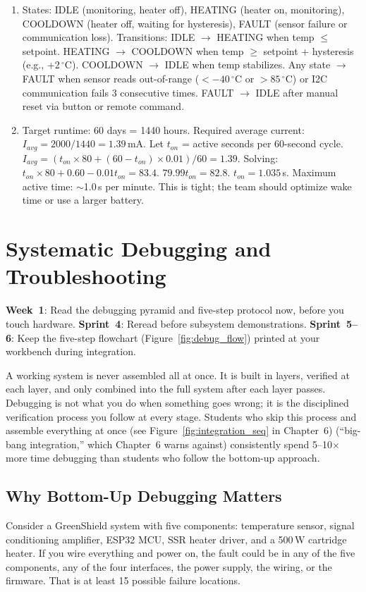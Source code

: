 \documentclass[11pt,letterpaper,twoside,openany]{book}
\newcommand{\degC}{\ensuremath{{}^{\circ}\text{C}}}
\begin{document}
\begin{enumerate}[leftmargin=1.5em]
\item States: IDLE (monitoring, heater off), HEATING (heater on, monitoring), COOLDOWN (heater off, waiting for hysteresis), FAULT (sensor failure or communication loss). Transitions: IDLE $\to$ HEATING when temp $\leq$ setpoint. HEATING $\to$ COOLDOWN when temp $\geq$ setpoint + hysteresis (e.g., +2\,\degC{}). COOLDOWN $\to$ IDLE when temp stabilizes. Any state $\to$ FAULT when sensor reads out-of-range ($<-40$\,\degC{} or $>85$\,\degC{}) or I2C communication fails 3 consecutive times. FAULT $\to$ IDLE after manual reset via button or remote command.
\item Target runtime: 60 days = 1440 hours. Required average current: $I_{avg} = 2000/1440 = 1.39$\,mA. Let $t_{on}$ = active seconds per 60-second cycle. $I_{avg} = (t_{on} \times 80 + (60 - t_{on}) \times 0.01)/60 = 1.39$. Solving: $t_{on} \times 80 + 0.60 - 0.01 t_{on} = 83.4$. $79.99 t_{on} = 82.8$. $t_{on} = 1.035$\,s. Maximum active time: $\sim$1.0\,s per minute. This is tight; the team should optimize wake time or use a larger battery.
\end{enumerate}



\chapter{Systematic Debugging and Troubleshooting}\label{ch:debug}

\begin{tipbox}
\textbf{Week~1}: Read the debugging pyramid and five-step protocol now, before you touch hardware. \textbf{Sprint~4}: Reread before subsystem demonstrations. \textbf{Sprint~5--6}: Keep the five-step flowchart (Figure~\ref{fig:debug_flow}) printed at your workbench during integration.
\end{tipbox}

A working system is never assembled all at once. It is built in layers, verified at each layer, and only combined into the full system after each layer passes. Debugging is not what you do when something goes wrong; it is the disciplined verification process you follow at every stage. Students who skip this process and assemble everything at once (see Figure~\ref{fig:integration_seq} in Chapter~6) (``big-bang integration,'' which Chapter~6 warns against) consistently spend 5--10$\times$ more time debugging than students who follow the bottom-up approach.

\section{Why Bottom-Up Debugging Matters}
Consider a GreenShield system with five components: temperature sensor, signal conditioning amplifier, ESP32 MCU, SSR heater driver, and a 500\,W cartridge heater. If you wire everything and power on, the fault could be in any of the five components, any of the four interfaces, the power supply, the wiring, or the firmware. That is at least 15 possible failure locations.
\end{document}
